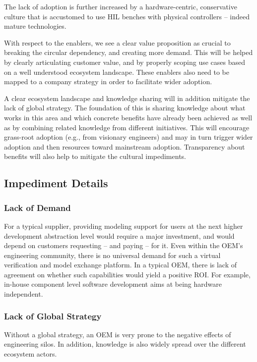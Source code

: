 The lack of adoption is further increased by a hardware-centric, conservative culture that is accustomed to use HIL benches with physical controllers -- indeed mature technologies.

With respect to the enablers, we see a clear value proposition as crucial to breaking the circular dependency, and creating more demand.
This will be helped by clearly articulating customer value, and by properly scoping use cases based on a well understood ecosystem landscape.
These enablers also need to be mapped to a company strategy in order to facilitate wider adoption. 

A clear ecosystem landscape and knowledge sharing will in addition mitigate the lack of global strategy.
The foundation of this is sharing knowledge about what works in this area and which concrete benefits have already been achieved as well as by combining related knowledge from different initiatives.
This will encourage grass-root adoption (e.g., from visionary engineers) and may in turn trigger wider adoption and then resources toward mainstream adoption.
Transparency about benefits will also help to mitigate the cultural impediments.

\subsection{Impediment Details}
\subsubsection*{Lack of Demand}
For a typical supplier,
providing modeling support for users at the next higher development abstraction level would require a major investment,
and would depend on customers requesting -- and paying -- for it.
%
Even within the OEM’s engineering community, there is no universal demand
for such a virtual verification and model exchange platform.
In a typical OEM, there is lack of agreement on whether such capabilities would yield a positive ROI.
For example, in-house component level software development aims at being hardware independent.


\subsubsection*{Lack of Global Strategy}
Without a global strategy, an OEM is very prone to the negative effects of engineering silos.
In addition, knowledge is also widely spread over the different ecosystem actors.

